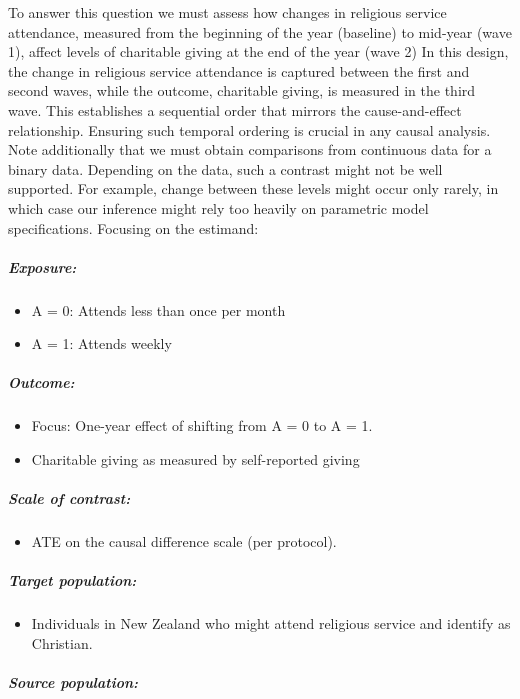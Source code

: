 \documentclass[
  singlecolumn]{article}
\let\oldsubparagraph\subparagraph
\renewcommand{\subparagraph}[1]{\oldsubparagraph{#1}\mbox{}}
\providecommand{\tightlist}{%
  \setlength{\itemsep}{0pt}\setlength{\parskip}{0pt}}\usepackage{longtable,booktabs,array}
\begin{document}
To answer this question we must assess how changes in religious service
attendance, measured from the beginning of the year (baseline) to
mid-year (wave 1), affect levels of charitable giving at the end of the
year (wave 2) In this design, the change in religious service attendance
is captured between the first and second waves, while the outcome,
charitable giving, is measured in the third wave. This establishes a
sequential order that mirrors the cause-and-effect relationship.
Ensuring such temporal ordering is crucial in any causal analysis. Note
additionally that we must obtain comparisons from continuous data for a
binary data. Depending on the data, such a contrast might not be well
supported. For example, change between these levels might occur only
rarely, in which case our inference might rely too heavily on parametric
model specifications. Focusing on the estimand:

\subparagraph{Exposure:}\label{exposure}

\begin{itemize}
\tightlist
\item
  A = 0: Attends less than once per month
\item
  A = 1: Attends weekly
\end{itemize}

\subparagraph{Outcome:}\label{outcome}

\begin{itemize}
\tightlist
\item
  Focus: One-year effect of shifting from A = 0 to A = 1.
\item
  Charitable giving as measured by self-reported giving
\end{itemize}

\subparagraph{Scale of contrast:}\label{scale-of-contrast}

\begin{itemize}
\tightlist
\item
  ATE on the causal difference scale (per protocol).
\end{itemize}

\subparagraph{Target population:}\label{target-population}

\begin{itemize}
\tightlist
\item
  Individuals in New Zealand who might attend religious service and
  identify as Christian.
\end{itemize}

\subparagraph{Source population:}\label{source-population}
\end{document}
